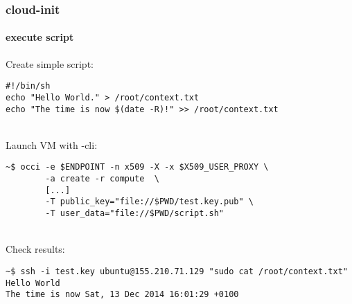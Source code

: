 \begin{frame}[fragile]
  \frametitle{cloud-init}
  \framesubtitle{execute script}

  Create simple script:
  \begin{Sbox}
  \Fontsmaller
  \begin{minipage}{\linewidth-2\fboxsep-2\fboxrule-4pt}
  \color{white}
  \begin{verbatim}
#!/bin/sh
echo "Hello World." > /root/context.txt
echo "The time is now $(date -R)!" >> /root/context.txt
  \end{verbatim}
  \end{minipage}
  \end{Sbox}

  \hfill\\

  Launch VM with \rocci-cli:
  \begin{Sbox}
  \Fontsmaller
  \begin{minipage}{\linewidth-2\fboxsep-2\fboxrule-4pt}
  \color{white}
  \begin{verbatim}
~$ occi -e $ENDPOINT -n x509 -X -x $X509_USER_PROXY \
        -a create -r compute  \
        [...]
        -T public_key="file://$PWD/test.key.pub" \
        -T user_data="file://$PWD/script.sh"
  \end{verbatim}
  \end{minipage}
  \end{Sbox}

  \hfill\\

  Check results:
  \begin{Sbox}
  \Fontsmaller
  \begin{minipage}{\linewidth-2\fboxsep-2\fboxrule-4pt}
  \color{white}
  \begin{verbatim}
~$ ssh -i test.key ubuntu@155.210.71.129 "sudo cat /root/context.txt"
Hello World
The time is now Sat, 13 Dec 2014 16:01:29 +0100
  \end{verbatim}
  \end{minipage}
  \end{Sbox}

\end{frame}
